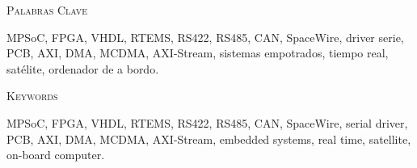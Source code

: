 \Large{\textsc{\textcolor{nar}{Palabras Clave}}} \par \par
\vspace{0.2cm}
\normalsize{MPSoC, FPGA, VHDL, RTEMS, RS422, RS485, CAN, SpaceWire, driver serie, PCB,
AXI, DMA, MCDMA, AXI-Stream, sistemas empotrados, tiempo real, satélite, ordenador de a bordo.} \par
\vspace{0.8cm}

\Large{\textsc{\textcolor{nar}{Keywords}}} \par
\vspace{0.2cm}
\normalsize{MPSoC, FPGA, VHDL, RTEMS, RS422, RS485, CAN, SpaceWire, serial driver, PCB,
AXI, DMA, MCDMA, AXI-Stream, embedded systems, real time, satellite, on-board computer.} \par
